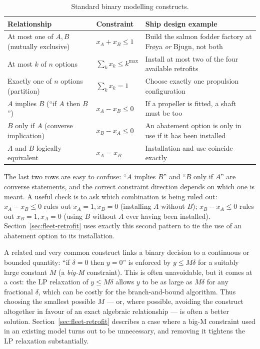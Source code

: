 \begin{table}[htbp]
  \centering
  \caption{Standard binary modelling constructs.}
  \label{tab:binary-constructs}
  \begin{tabular}{@{}p{}p{}p{}@{}}
    \toprule
    Relationship & Constraint & Ship design example \\
    \midrule
    At most one of $A,B$ (mutually exclusive) & $x_A+x_B\leq 1$ & Build the salmon fodder factory at Fr{\o}ya \emph{or} Bjugn, not both \\
    At most $k$ of $n$ options & $\sum_{k} x_k \leq k^{\max}$ & Install at most two of the four available retrofits \\
    Exactly one of $n$ options (partition) & $\sum_{k} x_k = 1$ & Choose exactly one propulsion configuration \\
    $A$ implies $B$ (``if $A$ then $B$'') & $x_A - x_B \leq 0$ & If a propeller is fitted, a shaft must be too \\
    $B$ only if $A$ (converse implication) & $x_B - x_A \leq 0$ & An abatement option is only in use if it has been installed \\
    $A$ and $B$ logically equivalent & $x_A = x_B$ & Installation and use coincide exactly \\
    \bottomrule
  \end{tabular}
\end{table}

The last two rows are easy to confuse: ``$A$ implies $B$'' and ``$B$ only
if $A$'' are converse statements, and the correct constraint direction
depends on which one is meant. A useful check is to ask which combination
is being ruled out: $x_A-x_B\leq0$ rules out $x_A=1,x_B=0$ (installing $A$
without $B$); $x_B-x_A\leq0$ rules out $x_B=1,x_A=0$ (using $B$ without
$A$ ever having been installed). Section~\ref{sec:fleet-retrofit} uses
exactly this second pattern to tie the use of an abatement option to its
installation.

A related and very common construct links a binary decision to a
continuous or bounded quantity: ``if $\delta=0$ then $y=0$'' is enforced
by $y\leq M\delta$ for a suitably large constant $M$ (a \emph{big-M}
constraint). This is often unavoidable, but it comes at a cost: the LP
relaxation of $y\leq M\delta$ allows $y$ to be as large as $M\delta$ for
any fractional $\delta$, which can be costly for the
branch-and-bound algorithm. Thus choosing the smallest possible
$M$ --- or, where possible, avoiding the construct altogether in favour of
an exact algebraic relationship --- is often a better solution.
Section~\ref{sec:fleet-retrofit} describes a case where a
big-M constraint used in an existing model turns out to be unnecessary,
and removing it tightens the LP relaxation substantially.

